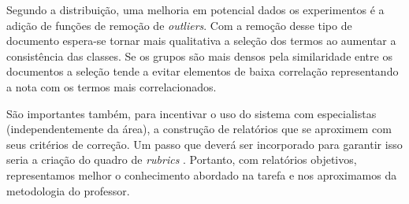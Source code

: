 Segundo a distribuição, uma melhoria em potencial dados os experimentos é a adição de funções de remoção de \textit{outliers}. Com a remoção desse tipo de documento espera-se tornar mais qualitativa a seleção dos termos ao aumentar a consistência das classes. Se os grupos são mais densos pela similaridade entre os documentos a seleção tende a evitar elementos de baixa correlação representando a nota com os termos mais correlacionados.

São importantes também, para incentivar o uso do sistema com especialistas (independentemente da área), a construção de relatórios que se aproximem com seus critérios de correção. Um passo que deverá ser incorporado para garantir isso seria a criação do quadro de \textit{rubrics} \cite{arter2006}. Portanto, com relatórios objetivos, representamos melhor o conhecimento abordado na tarefa e nos aproximamos da metodologia do professor.